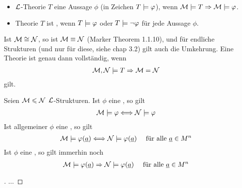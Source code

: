\begin{definition}
	\begin{itemize}
		\item $\mathcal L$-Theorie $T$  eine Aussage $\phi$ (in Zeichen $T \models \varphi$), wenn $\mathcal M \models T \Rightarrow \mathcal M \models \varphi$.
		\item Theorie $T$ ist , wenn $T \models \varphi$ oder $T \models \neg \varphi$ für jede Aussage $\phi$.
	\end{itemize}
\end{definition}
\begin{remark}
	Ist $\mathcal M \cong \mathcal N$, so ist $\mathcal M \equiv \mathcal N$ (Marker Theorem 1.1.10), und für endliche Strukturen (und nur für diese, siehe chap 3.2) gilt auch die Umkehrung. Eine Theorie ist genau dann vollständig, wenn
	\begin{align*}
		\mathcal M, \mathcal N \models T \Rightarrow \mathcal M = \mathcal N
	\end{align*}
	gilt. 
\end{remark}
\begin{remark}
	Seien $\mathcal M \leqslant \mathcal N$ $\mathcal L$-Strukturen. Ist $\phi$ eine , so gilt
	\begin{align*}
		\mathcal M \models \varphi \Longleftrightarrow \mathcal N \models \varphi
	\end{align*}
	Ist allgemeiner $\phi$ eine , so gilt
	\begin{align*}
		\mathcal M \models \varphi(\underline{a}) \Longleftrightarrow \mathcal N \models \varphi(\underline{a}) \quad \text{ für alle }\underline{a} \in M^n
	\end{align*}
	Ist $\phi$ eine , so gilt immerhin noch
	\begin{align*}
		\mathcal M \models \varphi(\underline{a}) \Rightarrow \mathcal N \models \varphi(\underline{a}) \quad \text{ für alle }\underline{a} \in M^n
	\end{align*}
\end{remark}
\begin{proof}[]
	$\dots$
\end{proof}
